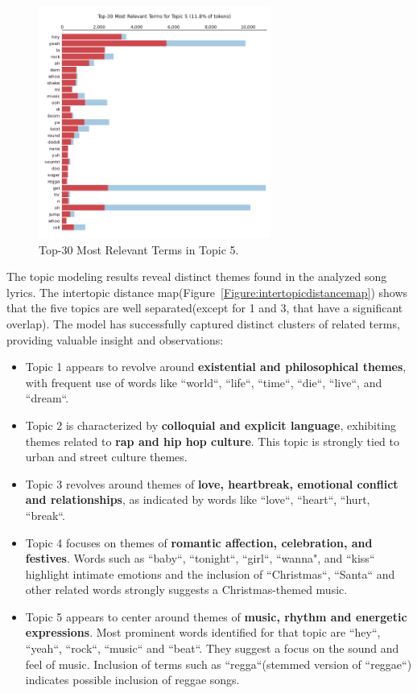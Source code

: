 \begin{center}
\begin{figure}[H]
  \centering
  \includegraphics[width=3in]{img/topics/png/t5.png}
  \caption{Top-30 Most Relevant Terms in Topic 5.}
  \label{Figure:fig_eh}
\end{figure}
\end{center}


The topic modeling results reveal distinct themes found in the analyzed song
lyrics. The intertopic distance map(Figure~\ref{Figure:intertopicdistancemap}) shows
that the five topics are well separated(except for 1 and 3, that have a
significant overlap). The model has successfully captured distinct clusters of
related terms, providing valuable insight and observations:

\begin{itemize}
    \item Topic 1 appears to revolve around \textbf{existential and philosophical
      themes}, with frequent use of words like ``world``, ``life``, ``time``,
      ``die``, ``live``, and ``dream``.
    \item Topic 2 is characterized by \textbf{colloquial and explicit
      language}, exhibiting themes related to \textbf{rap and hip hop culture}.
      This topic is strongly tied to urban and street culture themes.
    \item Topic 3 revolves around themes of \textbf{love, heartbreak, emotional
      conflict and relationships}, as indicated by words like ``love``,
      ``heart``, ``hurt, ``break``.
    \item Topic 4 focuses on themes of \textbf{romantic affection, celebration,
      and festives}. Words such as ``baby``, ``tonight``, ``girl``, ``wanna",
      and ``kiss`` highlight intimate emotions and the inclusion of
      ``Christmas``, ``Santa`` and other related words strongly suggests a
      Christmas-themed music.
    \item Topic 5 appears to center around themes of \textbf{music, rhythm and
      energetic expressions}. Most prominent words identified for that topic
      are ``hey``, ``yeah``, ``rock``, ``music`` and ``beat``. They suggest a
      focus on the sound and feel of music. Inclusion of terms such as
      ``regga``(stemmed version of ``reggae``) indicates possible inclusion of
      reggae songs.
\end{itemize}

